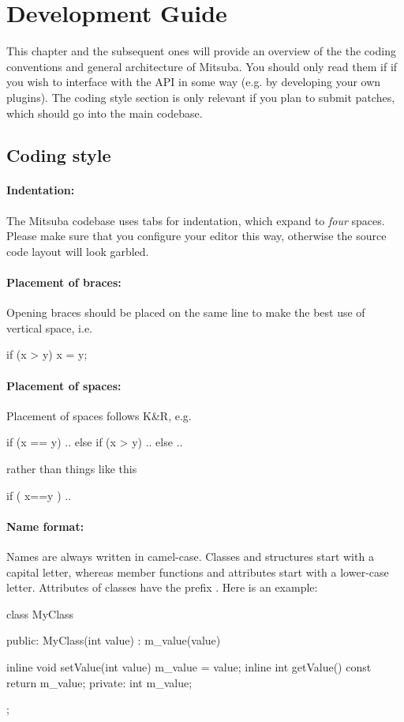 \section{Development Guide}
This chapter and the subsequent ones will provide an overview
of the the coding conventions and general architecture of Mitsuba. 
You should only read them if if you wish to interface with the API 
in some way (e.g. by developing your own plugins). The coding style
section is only relevant if you plan to submit patches, which should
go into the main codebase.

\subsection{Coding style}
\paragraph{Indentation:} The Mitsuba codebase uses tabs for indentation, 
which expand to \emph{four} spaces. Please make sure that you configure your editor
this way, otherwise the source code layout will look garbled.

\paragraph{Placement of braces:} Opening braces should be placed on the 
same line to make the best use of vertical space, i.e.
\begin{cpp}
if (x > y) {
	x = y;
}
\end{cpp}

\paragraph{Placement of spaces:} Placement of spaces follows K\&R, e.g.
\begin{cpp}
if (x == y) {
	..
} else if (x > y) {
	..
} else {
	..
}
\end{cpp}
rather than things like this
\begin{cpp}
if ( x==y ){
}
..
\end{cpp}

\paragraph{Name format:} Names are always written in camel-case. 
Classes and structures start with a capital letter, whereas member functions
and attributes start with a lower-case letter. Attributes of classes 
have the prefix . Here is an example:
\begin{cpp}
class MyClass {
public:
	MyClass(int value) : m_value(value) { }

	inline void setValue(int value) { m_value = value; }
	inline int getValue() const { return m_value; }
private:
	int m_value;
};
\end{cpp}

